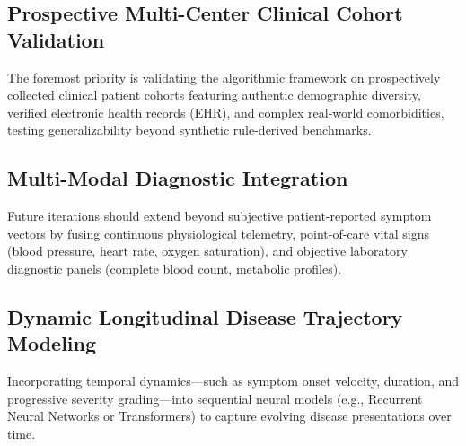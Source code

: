 \subsection{Prospective Multi-Center Clinical Cohort Validation}
\label{subsec:real_world_validation}
The foremost priority is validating the algorithmic framework on prospectively collected clinical patient cohorts featuring authentic demographic diversity, verified electronic health records (EHR), and complex real-world comorbidities, testing generalizability beyond synthetic rule-derived benchmarks.

\subsection{Multi-Modal Diagnostic Integration}
\label{subsec:multimodal_integration}
Future iterations should extend beyond subjective patient-reported symptom vectors by fusing continuous physiological telemetry, point-of-care vital signs (blood pressure, heart rate, oxygen saturation), and objective laboratory diagnostic panels (complete blood count, metabolic profiles).

\subsection{Dynamic Longitudinal Disease Trajectory Modeling}
\label{subsec:longitudinal_modeling}
Incorporating temporal dynamics—such as symptom onset velocity, duration, and progressive severity grading—into sequential neural models (e.g., Recurrent Neural Networks or Transformers) to capture evolving disease presentations over time.
